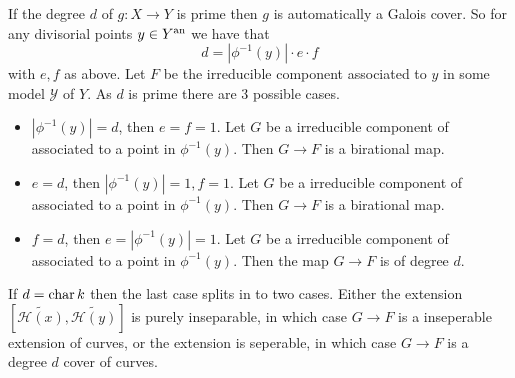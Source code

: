 \begin{remark}
	If the degree  $d$ of $g: X \to Y$ is prime then $g$ is automatically a Galois cover.
	So for any divisorial points $y \in Y{}^{\text{an}}$ we have that \[
		d = |\phi^{-1}(y)| \cdot e \cdot f
	\] 
	with $e, f$ as above. 
	Let $F$ be the irreducible component associated to $y$ in some model $\mathscr Y$ of $Y$. 
	As $d$ is prime there are 3 possible cases. 
	\begin{itemize}
		\item $|\phi^{-1}(y)| = d$, then $e = f = 1$. Let $G$ be a irreducible component of associated to a point in $\phi^{-1}(y)$. 
			Then $G \to F$ is a birational map. 
		\item $e = d$, then $|\phi^{-1}(y)| = 1, f = 1$. Let $G$ be a irreducible component of associated to a point in $\phi^{-1}(y)$. 
			Then $G \to F$ is a birational map. 
		\item $f = d$, then $e = |\phi^{-1}(y)| = 1$. Let $G$ be a irreducible component of associated to a point in $\phi^{-1}(y)$. 
			Then the map $G \to F$ is of degree $d$. 
	\end{itemize}
	If $d = \operatorname{char} k$ then the last case splits in to two cases. 
	Either the extension $\left[\widetilde{\mathcal{H} (x)}, \widetilde {\mathcal{H} (y)}\right]$ is purely inseparable, in which case $G \to F$ is a inseperable extension of curves, or the extension is seperable, in which case $G \to F$ is a degree $d$ cover of curves.
\end{remark}

